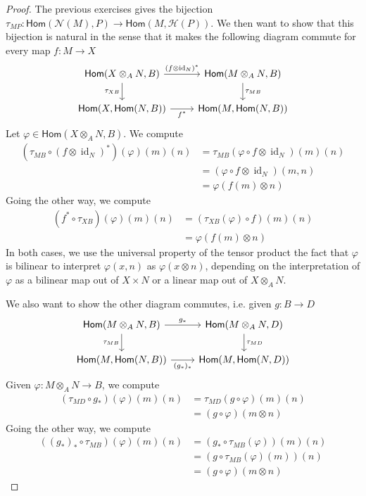 \documentclass[psamsfonts]{amsart}
\theoremstyle{definition}
\theoremstyle{remark}
\renewcommand{\hom}{\mathsf{Hom}}
\DeclareMathOperator{\id}{id}
\begin{document}
\begin{proof}
The previous exercises gives the bijection $\tau_{MP} : \hom(\mathcal{N}(M),P) \to \hom(M,\mathcal{H}(P))$. We then want to show that this bijection is natural in the sense that it makes the following diagram commute for every map $f : M \to X$
$$\begin{tikzcd}
\hom(X \otimes_A N, B) \arrow[d, "\tau_{XB}"'] \arrow[r, "(f\otimes \id_N)^*"] & \hom(M \otimes_A N, B) \arrow[d,"\tau_{MB}"] \\
\hom(X, \hom(N,B)) \arrow[r, "f^*"'] & \hom(M, \hom(N,B))
\end{tikzcd}$$
Let $\varphi \in \hom(X \otimes_A N, B)$. We compute
\begin{align*}
(\tau_{MB} \circ (f \otimes \id_N)^*)(\varphi)(m)(n) &= \tau_{MB}(\varphi \circ f \otimes \id_N)(m)(n) \\
&= (\varphi \circ f \otimes \id_N)(m,n) \\
&= \varphi(f(m) \otimes n)
\end{align*}
Going the other way, we compute
\begin{align*}
(f^* \circ \tau_{XB})(\varphi)(m)(n) &= (\tau_{XB}(\varphi) \circ f)(m)(n) \\
&= \varphi(f(m) \otimes n)
\end{align*}
In both cases, we use the universal property of the tensor product the fact that $\varphi$ is bilinear to interpret $\varphi(x,n)$ as $\varphi(x \otimes n)$, depending on the interpretation of $\varphi$ as a bilinear map out of $X \times N$ or a linear map out of $X \otimes_A N$.

We also want to show the other diagram commutes, i.e. given $g : B \to D$
$$\begin{tikzcd}
\hom(M \otimes_A N, B) \arrow[d,"\tau_{MB}"']\arrow[r, "g_*"] & \hom(M \otimes_A N,  D) \arrow[d,"\tau_{MD}"] \\
\hom(M, \hom(N,B)) \arrow[r, "(g_*)_*"'] & \hom(M, \hom(N,D))
\end{tikzcd}$$
Given $\varphi : M \otimes_A N \to B$, we compute
\begin{align*}
(\tau_{MD} \circ g_*)(\varphi)(m)(n) &= \tau_{MD}(g \circ \varphi)(m)(n) \\
&= (g \circ \varphi)(m \otimes n)
\end{align*}
Going the other way, we compute
\begin{align*}
((g_*)_* \circ \tau_{MB})(\varphi)(m)(n) &= (g_* \circ \tau_{MB}(\varphi))(m)(n) \\
&= (g \circ \tau_{MB}(\varphi)(m))(n) \\
&= (g \circ \varphi)(m \otimes n)
\end{align*}
\end{proof}
\end{document}
